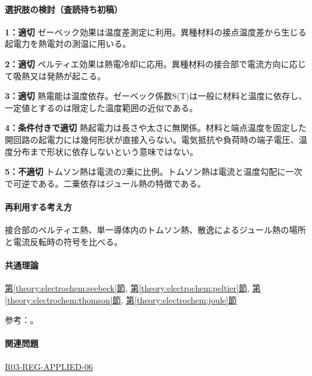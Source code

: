 \paragraph{選択肢の検討（査読待ち初稿）}\mbox{}\par

\noindent\textbf{1：適切} ゼーベック効果は温度差測定に利用。異種材料の接点温度差から生じる起電力を熱電対の測温に用いる。\par

\noindent\textbf{2：適切} ペルティエ効果は熱電冷却に応用。異種材料の接合部で電流方向に応じて吸熱又は発熱が起こる。\par

\noindent\textbf{3：適切} 熱電能は温度依存。ゼーベック係数S(T)は一般に材料と温度に依存し、一定値とするのは限定した温度範囲の近似である。\par

\noindent\textbf{4：条件付きで適切} 熱起電力は長さや太さに無関係。材料と端点温度を固定した開回路の起電力には幾何形状が直接入らない。電気抵抗や負荷時の端子電圧、温度分布まで形状に依存しないという意味ではない。\par

\noindent\textbf{5：不適切} トムソン熱は電流の2乗に比例。トムソン熱は電流と温度勾配に一次で可逆である。二乗依存はジュール熱の特徴である。\par

\paragraph{再利用する考え方} 接合部のペルティエ熱、単一導体内のトムソン熱、散逸によるジュール熱の場所と電流反転時の符号を比べる。

\paragraph{共通理論} \hyperref[theory:electrochem:seebeck]{第\ref*{theory:electrochem:seebeck}節}, \hyperref[theory:electrochem:peltier]{第\ref*{theory:electrochem:peltier}節}, \hyperref[theory:electrochem:thomson]{第\ref*{theory:electrochem:thomson}節}, \hyperref[theory:electrochem:joule]{第\ref*{theory:electrochem:joule}節}

\par 参考：\cite{mit_thermoelectric2024}。

\paragraph{関連問題} \hyperref[q:r03-reg-applied-06]{R03-REG-APPLIED-06}

